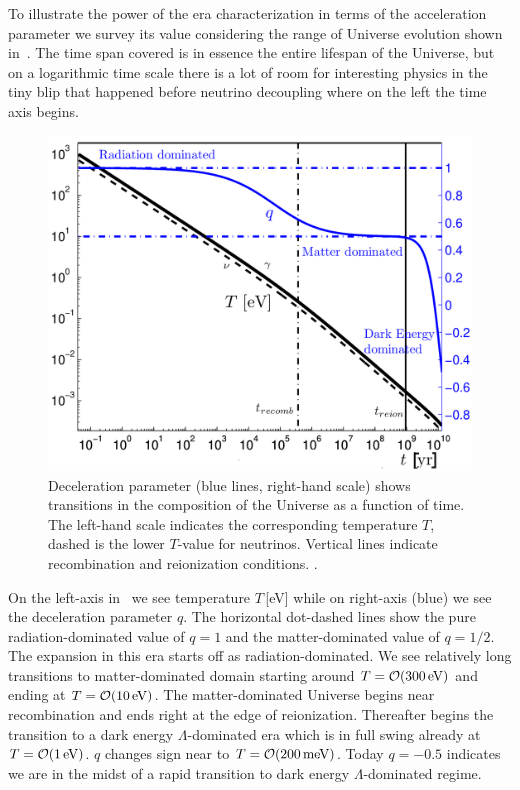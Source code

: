To illustrate the power of the era characterization in terms of the acceleration parameter we survey its value considering the range of Universe evolution shown in~. The time span covered is in essence the entire lifespan of the Universe, but on a logarithmic time scale there is a lot of room for interesting physics in the tiny blip that happened before neutrino decoupling where on the left the time axis begins. 

\begin{figure}
\centerline{\includegraphics[width=0.75\linewidth]{plots/Tqtoday.png}}
\caption{Deceleration parameter (blue lines, right-hand scale) shows transitions in the composition of the Universe as a function of time. The left-hand scale indicates the corresponding temperature $T$, dashed is the lower $T$-value for neutrinos. Vertical lines indicate recombination and reionization conditions. .
\label{fig:today} }
\end{figure}

On the left-axis in~ we see temperature $T$\,[eV] while on right-axis (blue) we see the deceleration parameter $q$. The horizontal dot-dashed lines show the pure radiation-dominated value of $q=1$ and the matter-dominated value of $q=1/2$. The expansion in this era starts off as radiation-dominated. We see relatively long transitions to matter-dominated domain starting around $T=\mathcal{O}(300\text{\,eV})$ and ending at $T=\mathcal{O}(10\text{\,eV})$. The matter-dominated Universe begins near recombination and ends right at the edge of reionization. Thereafter begins the transition to a dark energy $\Lambda$-dominated era which is in full swing already at $T=\mathcal{O}(1\text{\,eV})$. $q$ changes sign near to $T=\mathcal{O}(200\text{\,meV})$. Today $q=-0.5$ indicates we are in the midst of a rapid transition to dark energy $\Lambda$-dominated regime. 


